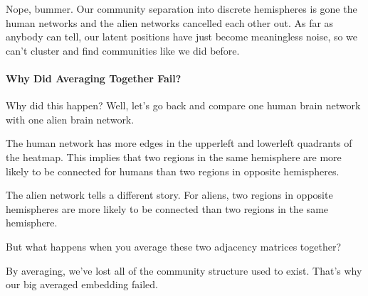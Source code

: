 \documentclass[letterpaper,10pt,english]{jupyterBook}
\begin{document}
\noindent{}

\sphinxAtStartPar
Nope, bummer. Our community separation into discrete hemispheres is gone \sphinxhyphen{} the human networks and the alien networks cancelled each other out. As far as anybody can tell, our latent positions have just become meaningless noise, so we can’t cluster and find communities like we did before.


\paragraph{Why Did Averaging Together Fail?}
\label{\detokenize{representations/ch6/multigraph-representation-learning:why-did-averaging-together-fail}}
\sphinxAtStartPar
Why did this happen? Well, let’s go back and compare one human brain network with one alien brain network.

\noindent{}

\sphinxAtStartPar
The human network has more edges in the upper\sphinxhyphen{}left and lower\sphinxhyphen{}left quadrants of the heatmap. This implies that two regions in the same hemisphere are more likely to be connected for humans than two regions in opposite hemispheres.

\sphinxAtStartPar
The alien network tells a different story. For aliens, two regions in opposite hemispheres are more likely to be connected than two regions in the same hemisphere.

\sphinxAtStartPar
But what happens when you average these two adjacency matrices together?

\begin{sphinxVerbatim}[commandchars=\\\{\}]
  \PYG{p}{[}\PYG{p}{[}\PYG{p}{]} \PYG{p}{[}\PYG{p}{]}\PYG{p}{]}
   
\end{sphinxVerbatim}

\noindent{}

\sphinxAtStartPar
By averaging, we’ve lost all of the community structure used to exist. That’s why our big averaged embedding failed.
\end{document}
